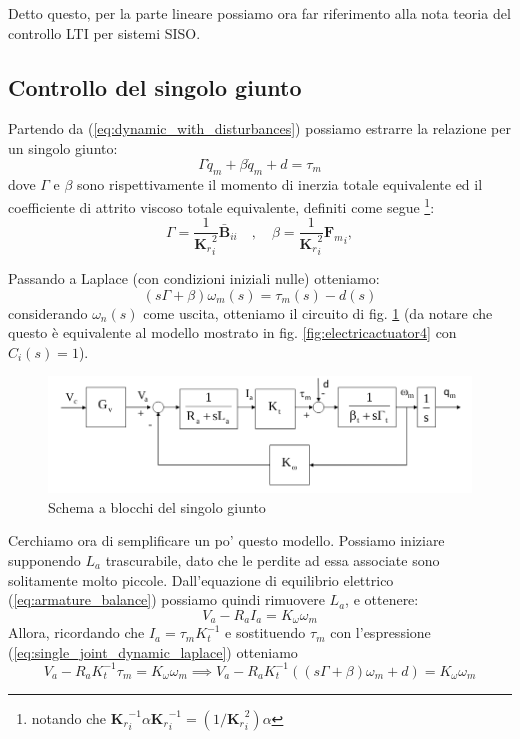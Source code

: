 Detto questo, per la parte lineare possiamo ora far riferimento alla nota teoria del controllo LTI per sistemi SISO.



\subsection{Controllo del singolo giunto}

Partendo da (\ref{eq:dynamic_with_disturbances}) possiamo estrarre la relazione per un singolo giunto:
\begin{equation}\label{eq:single_joint_dynamic}
\Gamma \ddot{q}_m + \beta \dot{q}_m + d = \tau_m
\end{equation}
dove $\Gamma$ e $\beta$ sono rispettivamente il momento di inerzia totale equivalente ed il coefficiente di attrito viscoso totale equivalente, definiti come segue 
\footnote{notando che ${\mathbf{K}_r}_i^{-1} \alpha {\mathbf{K}_r}_i^{-1} = (1/{\mathbf{K}_r}_i^2) \alpha $}:
$$
\Gamma = \frac{1}{{\mathbf{K}_r}_i^2} \mathbf{\bar{B}}_{ii} 
\quad , \quad
\beta = \frac{1}{{\mathbf{K}_r}_i^2} {\mathbf{F}_m}_i, 
$$

Passando a Laplace (con condizioni iniziali nulle) otteniamo:
\begin{equation}\label{eq:single_joint_dynamic_laplace}
(s\Gamma + \beta) \omega_m(s) = \tau_m(s) - d(s)
\end{equation}
considerando $\omega_n(s)$ come uscita, otteniamo il circuito di fig. \ref{fig:decentralizedjointspacecontrol3} (da notare che questo è equivalente al modello mostrato in fig. \ref{fig:electricactuator4} con $C_i(s) = 1$).

\begin{figure}[th!]
	\centering
	\includegraphics[width=0.7\linewidth]{images/decentralized_joint_space_control_3}
	\caption{Schema a blocchi del singolo giunto}
	\label{fig:decentralizedjointspacecontrol3}
\end{figure}


Cerchiamo ora di semplificare un po' questo modello. Possiamo iniziare supponendo $L_a$ trascurabile, dato che le perdite ad essa associate sono solitamente molto piccole.
Dall'equazione di equilibrio elettrico (\ref{eq:armature_balance}) possiamo quindi rimuovere $L_a$, e ottenere:
\begin{equation}\label{eq:simplified_armature_electrical_balance}
V_a - R_aI_a = K_\omega \omega_m
\end{equation}
Allora, ricordando che $I_a = \tau_m K_t^{-1}$ e sostituendo $\tau_m$ con l'espressione (\ref{eq:single_joint_dynamic_laplace}) otteniamo 
$$
V_a - R_a K_t^{-1} \tau_m = K_\omega \omega_m
\implies
V_a - R_a K_t^{-1} ((s\Gamma + \beta)\omega_m + d)
= K_\omega \omega_m
$$




